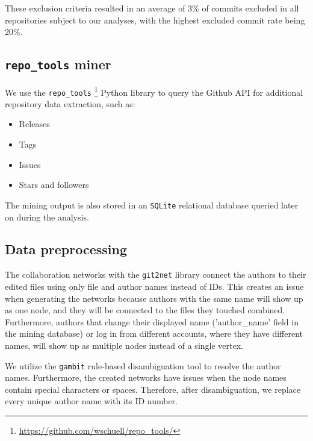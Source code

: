 These exclusion criteria resulted in an average of 3\% of commits excluded in all repositories subject to our analyses, with the highest excluded commit rate being 20\%.

\subsection{\texttt{repo\_tools} miner} 

We use the \texttt{repo\_tools} \footnote{\url{https://github.com/wschuell/repo\_tools/}} Python library to query the Github API for additional repository data extraction, such as:

\begin{itemize}
    \item Releases
    \item Tags
    \item Issues
    \item Stars and followers
\end{itemize}

The mining output is also stored in an \texttt{SQLite} relational database queried later on during the analysis. 


\subsection{Data preprocessing}

The collaboration networks with the \texttt{git2net} library connect the authors to their edited files using only file and author names instead of IDs. This creates an issue when generating the networks because authors with the same name will show up as one node, and they will be connected to the files they touched combined. Furthermore, authors that change their displayed name ('author\_name' field in the mining database) or log in from different accounts, where they have different names, will show up as multiple nodes instead of a single vertex.

We utilize the \texttt{gambit} \cite{goteGambitOpenSource2021} rule-based disambiguation tool to resolve the author names. Furthermore, the created networks have issues when the node names contain special characters or spaces. Therefore, after disambiguation, we replace every unique author name with its ID number.

